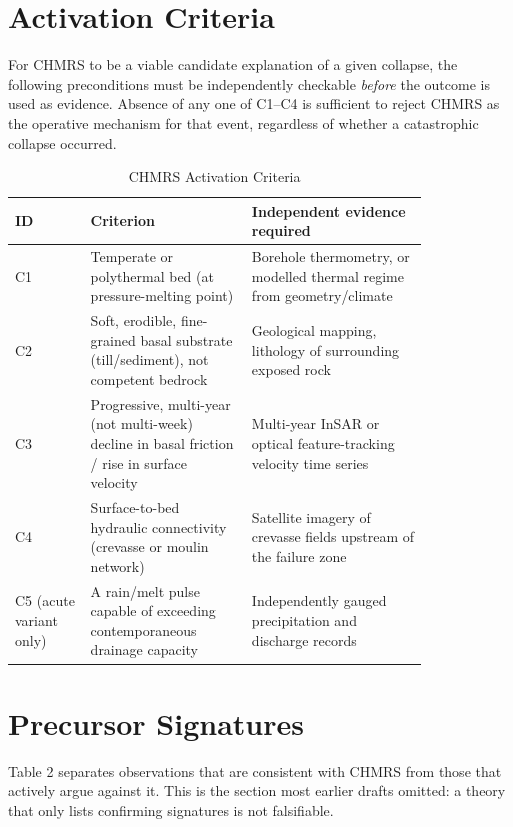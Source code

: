 \documentclass[11pt,twocolumn]{article}
\begin{document}
\section{Activation Criteria}
For CHMRS to be a viable candidate explanation of a given collapse, the following preconditions must be independently checkable \emph{before} the outcome is used as evidence. Absence of any one of C1--C4 is sufficient to reject CHMRS as the operative mechanism for that event, regardless of whether a catastrophic collapse occurred.

\begin{table}[h]
\centering
\caption{CHMRS Activation Criteria}
\small
\begin{tabular}{p{0.15\linewidth}p{0.32\linewidth}p{0.35\linewidth}}
\toprule
\textbf{ID} & \textbf{Criterion} & \textbf{Independent evidence required} \\
\midrule
C1 & Temperate or polythermal bed (at pressure-melting point) & Borehole thermometry, or modelled thermal regime from geometry/climate \cite{gilbert2018} \\
C2 & Soft, erodible, fine-grained basal substrate (till/sediment), not competent bedrock & Geological mapping, lithology of surrounding exposed rock \cite{gilbert2018,kotlyakov2004} \\
C3 & Progressive, multi-year (not multi-week) decline in basal friction / rise in surface velocity & Multi-year InSAR or optical feature-tracking velocity time series \\
C4 & Surface-to-bed hydraulic connectivity (crevasse or moulin network) & Satellite imagery of crevasse fields upstream of the failure zone \\
C5 (acute variant only) & A rain/melt pulse capable of exceeding contemporaneous drainage capacity & Independently gauged precipitation and discharge records \\
\bottomrule
\end{tabular}
\end{table}

\section{Precursor Signatures}
Table 2 separates observations that are consistent with CHMRS from those that actively argue against it. This is the section most earlier drafts omitted: a theory that only lists confirming signatures is not falsifiable.
\end{document}
